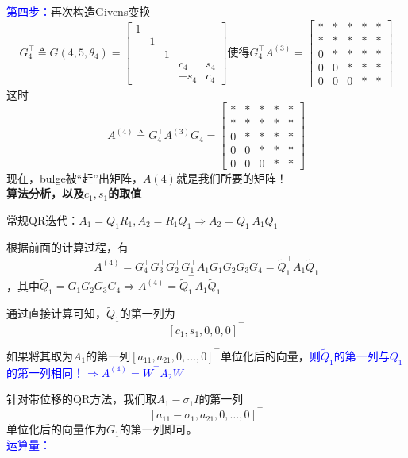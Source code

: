 \documentclass[12pt,a4paper]{article}
\begin{document}
\textcolor{blue}{第四步：}\quad 再次构造Givens变换$$
G_{4}^{\top} \triangleq G\left(4,5, \theta_{4}\right)=\left[\begin{array}{ccccc}{1} & {} & {}& {} &\\ {} & {1} & {} & {}&\\ {} & {}& {1} & {}&\\ {} & {}& {} & {c_4}&s_4\\{} & {}& {} & {-s_4}&c_4\end{array}\right]
\text{使得}G_{4}^{\top} A^{(3)}=\left[\begin{array}{ccccc}{*} & {*} & {*} & {*}& {*}\\ {*} & {*} & {*} & {*} & {*}\\ {0} & {*} & {*} & {*}& {*} \\ {0} & {0} & {*} & {*}& {*} \\ {0} & {0} & {0} & {*}& {*}\end{array}\right]
$$这时$$
A^{(4)} \triangleq G_{4}^{\top} A^{(3)} G_{4}=\left[\begin{array}{ccccc}{*} & {*} & {*} & {*}& {*}\\ {*} & {*} & {*} & {*}& {*}\\ {0} & {*} & {*}& {*}& {*} \\ {0} & {0} & {*} & {*}& {*}\\ {0} & {0} & {0} & {*}& {*}\end{array}\right]
$$
现在，bulge被“赶”出矩阵，$A{(4)}$就是我们所要的矩阵！\\
\textbf{算法分析，以及$c_1,s_1$的取值}

常规QR迭代：$A_{1}=Q_{1} R_{1}, A_{2}=R_{1} Q_{1} \Longrightarrow A_{2}=Q_{1}^{\top} A_{1} Q_{1}$

根据前面的计算过程，有$$
A^{(4)}=G_{4}^{\top} G_{3}^{\top} G_{2}^{\top} G_{1}^{\top} A_{1} G_{1} G_{2} G_{3} G_{4}=\tilde{Q}_{1}^{\top} A_{1} \tilde{Q}_{1}
$$，其中$\tilde{Q}_{1}=G_{1} G_{2} G_{3} G_{4} \Longrightarrow A^{(4)}=\tilde{Q}_{1}^{\top} A_{1} \tilde{Q}_{1}$

通过直接计算可知，$\tilde{Q}_{1}$的第一列为$$
\left[c_{1}, s_{1}, 0,0,0\right]^{\top}
$$

如果将其取为$A_1$的第一列$\left[a_{11}, a_{21}, 0, \ldots, 0\right]^{\top}$单位化后的向量，\textcolor{blue}{则$\tilde{Q}_{1}$的第一列与$Q_{1}$的第一列相同！$\Longrightarrow A^{(4)}=W^{\top} A_{2} W$}

针对带位移的QR方法，我们取$A_{1}-\sigma_{1} I$的第一列$$
\left[a_{11}-\sigma_{1}, a_{21}, 0, \ldots, 0\right]^{\top}
$$单位化后的向量作为$G_1$的第一列即可。\\
\textcolor{blue}{运算量：}
\end{document}
